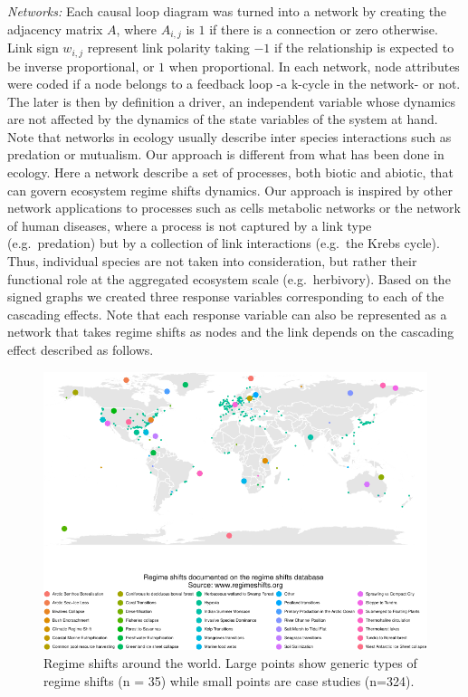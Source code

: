 \documentclass[9pt,]{article}
\begin{document}
\emph{Networks:} Each causal loop diagram was turned into a network by
creating the adjacency matrix \(A\), where \(A_{i,j}\) is \(1\) if there
is a connection or zero otherwise. Link sign \(w_{i,j}\) represent link
polarity taking \(-1\) if the relationship is expected to be inverse
proportional, or \(1\) when proportional. In each network, node
attributes were coded if a node belongs to a feedback loop -a k-cycle in
the network- or not. The later is then by definition a driver, an
independent variable whose dynamics are not affected by the dynamics of
the state variables of the system at hand. Note that networks in ecology
usually describe inter species interactions such as predation or
mutualism. Our approach is different from what has been done in ecology.
Here a network describe a set of processes, both biotic and abiotic,
that can govern ecosystem regime shifts dynamics. Our approach is
inspired by other network applications to processes such as cells
metabolic networks or the network of human diseases, where a process is
not captured by a link type (e.g.~predation) but by a collection of link
interactions (e.g.~the Krebs cycle). Thus, individual species are not
taken into consideration, but rather their functional role at the
aggregated ecosystem scale (e.g.~herbivory). Based on the signed graphs
we created three response variables corresponding to each of the
cascading effects. Note that each response variable can also be
represented as a network that takes regime shifts as nodes and the link
depends on the cascading effect described as follows.

\begin{figure}

{\centering \includegraphics{170417_draft_files/figure-latex/Fig1-1} 

}

\caption{Regime shifts around the world. Large points show generic types of regime shifts (n = 35) while small points are case studies (n=324).}\label{fig:Fig1}
\end{figure}
\end{document}
